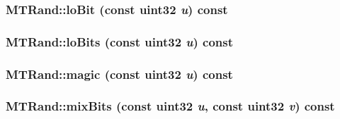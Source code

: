 \begin{CompactItemize}
\begin{CompactItemize}
\hypertarget{classMTRand_6f5a4a532e1c3acd42052046594205be}{
\subsubsection[{loBit}]{ MTRand::loBit (const {\bf uint32} {\em u}) const}}
\label{classMTRand_6f5a4a532e1c3acd42052046594205be}


\hypertarget{classMTRand_d846f81f7abfc1b20c51d1563b8e5d45}{
\subsubsection[{loBits}]{ MTRand::loBits (const {\bf uint32} {\em u}) const}}
\label{classMTRand_d846f81f7abfc1b20c51d1563b8e5d45}


\hypertarget{classMTRand_8539a48116c85704c5101981cb0823e7}{
\subsubsection[{magic}]{ MTRand::magic (const {\bf uint32} {\em u}) const}}
\label{classMTRand_8539a48116c85704c5101981cb0823e7}


\hypertarget{classMTRand_bdd5587252ed1ac89cb274e4bf4881da}{
\subsubsection[{mixBits}]{ MTRand::mixBits (const {\bf uint32} {\em u}, \/  const {\bf uint32} {\em v}) const}}
\label{classMTRand_bdd5587252ed1ac89cb274e4bf4881da}


\hypertarget{classMTRand_bbb87a08d622d58fdee0eea4cb5471a0}{
}
\end{CompactItemize}
\end{CompactItemize}
